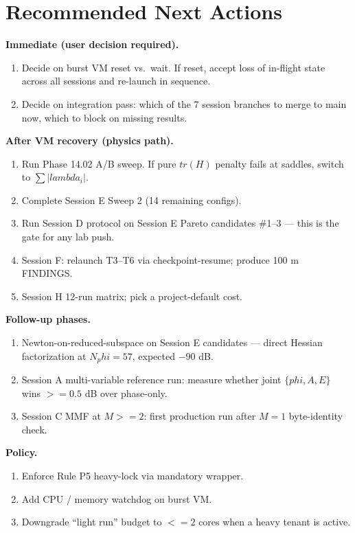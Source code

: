 \documentclass[11pt,letterpaper]{article}
\def\varphi{phi}%
\def\mathrm#1{#1}%
\def\lambda{lambda}%
\def\geq{>=}%
\def\leq{<=}%
\def\texttt#1{#1}%
\begin{document}
\newpage
\section{Recommended Next Actions}

\textbf{Immediate (user decision required).}
\begin{enumerate}[leftmargin=*]
  \item Decide on burst VM reset vs.\ wait. If reset, accept loss of in-flight state across all sessions and re-launch in sequence.
  \item Decide on integration pass: which of the 7 session branches to merge to \texttt{main} now, which to block on missing results.
\end{enumerate}

\textbf{After VM recovery (physics path).}
\begin{enumerate}[leftmargin=*,resume]
  \item Run Phase 14.02 A/B sweep. If pure $\mathrm{tr}(H)$ penalty fails at saddles, switch to $\sum |\lambda_i|$.
  \item Complete Session E Sweep 2 (14 remaining configs).
  \item Run Session D protocol on Session E Pareto candidates \#1--3 --- this is the gate for any lab push.
  \item Session F: relaunch T3--T6 via checkpoint-resume; produce 100 m FINDINGS.
  \item Session H 12-run matrix; pick a project-default cost.
\end{enumerate}

\textbf{Follow-up phases.}
\begin{enumerate}[leftmargin=*,resume]
  \item Newton-on-reduced-subspace on Session E candidates --- direct Hessian factorization at $\mathrm{N}_\varphi = 57$, expected $-90$ dB.
  \item Session A multi-variable reference run: measure whether joint $\{\varphi, A, E\}$ wins $\geq 0.5$ dB over phase-only.
  \item Session C MMF at $M \geq 2$: first production run after $M = 1$ byte-identity check.
\end{enumerate}

\textbf{Policy.}
\begin{enumerate}[leftmargin=*,resume]
  \item Enforce Rule P5 heavy-lock via mandatory wrapper.
  \item Add CPU / memory watchdog on burst VM.
  \item Downgrade ``light run'' budget to $\leq 2$ cores when a heavy tenant is active.
\end{enumerate}
\end{document}
